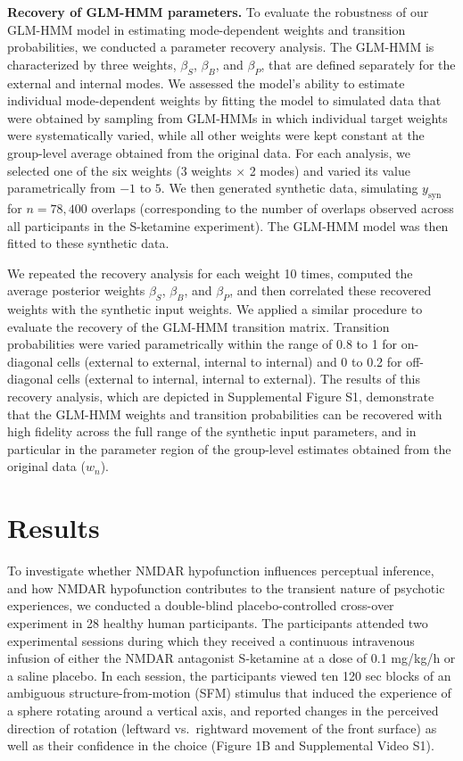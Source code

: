 \documentclass[
]{article}
\begin{document}
\textbf{Recovery of GLM-HMM parameters.} To evaluate the robustness of
our GLM-HMM model in estimating mode-dependent weights and transition
probabilities, we conducted a parameter recovery analysis. The GLM-HMM
is characterized by three weights, \(\beta_S\), \(\beta_B\), and
\(\beta_P\), that are defined separately for the external and internal
modes. We assessed the model's ability to estimate individual
mode-dependent weights by fitting the model to simulated data that were
obtained by sampling from GLM-HMMs in which individual target weights
were systematically varied, while all other weights were kept constant
at the group-level average obtained from the original data. For each
analysis, we selected one of the six weights (3 weights \(\times\) 2
modes) and varied its value parametrically from \(-1\) to \(5\). We then
generated synthetic data, simulating \(y_{\text{syn}}\) for
\(n = 78{,}400\) overlaps (corresponding to the number of overlaps
observed across all participants in the S-ketamine experiment). The
GLM-HMM model was then fitted to these synthetic data.

We repeated the recovery analysis for each weight 10 times, computed the
average posterior weights \(\beta_S\), \(\beta_B\), and \(\beta_P\), and
then correlated these recovered weights with the synthetic input
weights. We applied a similar procedure to evaluate the recovery of the
GLM-HMM transition matrix. Transition probabilities were varied
parametrically within the range of 0.8 to 1 for on-diagonal cells
(external to external, internal to internal) and 0 to 0.2 for
off-diagonal cells (external to internal, internal to external). The
results of this recovery analysis, which are depicted in Supplemental
Figure S1, demonstrate that the GLM-HMM weights and transition
probabilities can be recovered with high fidelity across the full range
of the synthetic input parameters, and in particular in the parameter
region of the group-level estimates obtained from the original data
(\(w_n\)).

\section{Results}\label{results}

To investigate whether NMDAR hypofunction influences perceptual
inference, and how NMDAR hypofunction contributes to the transient
nature of psychotic experiences, we conducted a double-blind
placebo-controlled cross-over experiment in 28 healthy human
participants. The participants attended two experimental sessions during
which they received a continuous intravenous infusion of either the
NMDAR antagonist S-ketamine at a dose of 0.1 mg/kg/h or a saline
placebo. In each session, the participants viewed ten 120 sec blocks of
an ambiguous structure-from-motion (SFM) stimulus that induced the
experience of a sphere rotating around a vertical axis, and reported
changes in the perceived direction of rotation (leftward vs.~rightward
movement of the front surface) as well as their confidence in the choice
(Figure 1B and Supplemental Video S1).
\end{document}
